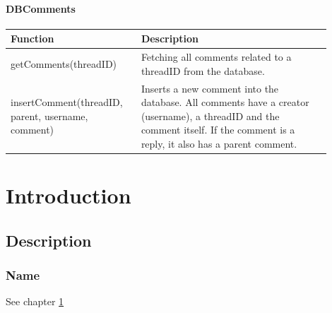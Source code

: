 \documentclass[11pt]{report}
\begin{document}
\subsubsection{DBComments}
\begin{minipage}{\linewidth}
  \centering
  \setlength{\tabcolsep}{12pt}
  \begin{tabular}{|p{0.35\linewidth}|p{0.55\linewidth}|}
  \hline
  \cellcolor{gray!25} Function & \cellcolor{gray!25} Description \\
  \hline
  getComments(threadID) & Fetching all comments related to a threadID from the database. \\
  insertComment(threadID, parent, username, comment) & Inserts a new comment into the database. All comments have a creator (username), a threadID and the comment itself. If the comment is a reply, it also has a parent comment. \\
  \hline  
  \end{tabular}
\end{minipage}



\chapter{Introduction}
\label{chap:Intro}

\section{Description}
\label{sec:IntroDescr}

\subsection{Name}
\label{subsec:IntroDescrName}

\label{fig:FigName}

\label{tab:TabName}

See chapter \ref{chap:Intro}
\end{document}
